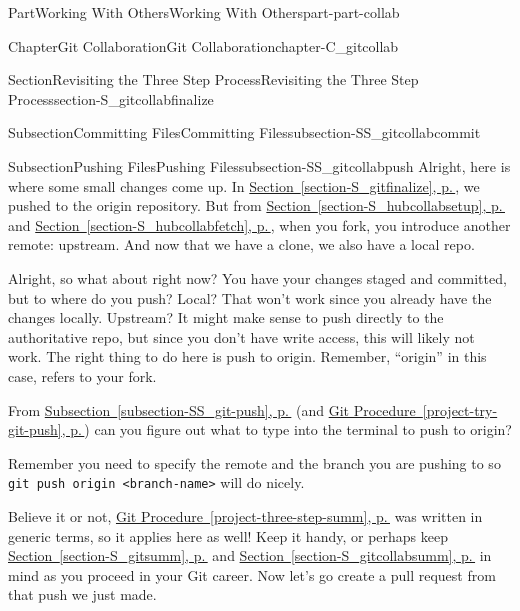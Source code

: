 \documentclass[twoside,10pt,]{book}
\newcommand{\xreffont}{\relax}
\newcommand{\mono}[1]{\texttt{#1}}
\begin{document}
\begin{partptx}{Part}{Working With Others}{}{Working With Others}{}{}{part-part-collab}
\begin{chapterptx}{Chapter}{Git Collaboration}{}{Git Collaboration}{}{}{chapter-C_gitcollab}
\begin{sectionptx}{Section}{Revisiting the Three Step Process}{}{Revisiting the Three Step Process}{}{}{section-S_gitcollabfinalize}
\begin{subsectionptx}{Subsection}{Committing Files}{}{Committing Files}{}{}{subsection-SS_gitcollabcommit}
\end{subsectionptx}
%
%
\typeout{************************************************}
\typeout{************************************************}
%
\begin{subsectionptx}{Subsection}{Pushing Files}{}{Pushing Files}{}{}{subsection-SS_gitcollabpush}
%
%
Alright, here is where some small changes come up. In \hyperref[section-S_gitfinalize]{Section~{\xreffont\ref{section-S_gitfinalize}}, p.\,\pageref{section-S_gitfinalize}}, we pushed to the origin repository. But from \hyperref[section-S_hubcollabsetup]{Section~{\xreffont\ref{section-S_hubcollabsetup}}, p.\,\pageref{section-S_hubcollabsetup}} and \hyperref[section-S_hubcollabfetch]{Section~{\xreffont\ref{section-S_hubcollabfetch}}, p.\,\pageref{section-S_hubcollabfetch}}, when you fork, you introduce another remote: upstream. And now that we have a clone, we also have a local repo.%
\par
Alright, so what about right now? You have your changes staged and committed, but to where do you push? Local? That won't work since you already have the changes locally. Upstream? It might make sense to push directly to the authoritative repo, but since you don't have write access, this will likely not work. The right thing to do here is push to origin. Remember, ``origin'' in this case, refers to your fork.%
\par
From \hyperref[subsection-SS_git-push]{Subsection~{\xreffont\ref{subsection-SS_git-push}}, p.\,\pageref{subsection-SS_git-push}} (and \hyperref[project-try-git-push]{Git Procedure~{\xreffont\ref{project-try-git-push}}, p.\,\pageref{project-try-git-push}}) can you figure out what to type into the terminal to push to origin?%
\par
Remember you need to specify the remote and the branch you are pushing to so \mono{git push origin <branch-name>} will do nicely.%
\end{subsectionptx}
\begin{conclusion}{}%
Believe it or not, \hyperref[project-three-step-summ]{Git Procedure~{\xreffont\ref{project-three-step-summ}}, p.\,\pageref{project-three-step-summ}} was written in generic terms, so it applies here as well! Keep it handy, or perhaps keep \hyperref[section-S_gitsumm]{Section~{\xreffont\ref{section-S_gitsumm}}, p.\,\pageref{section-S_gitsumm}} and \hyperref[section-S_gitcollabsumm]{Section~{\xreffont\ref{section-S_gitcollabsumm}}, p.\,\pageref{section-S_gitcollabsumm}} in mind as you proceed in your Git career. Now let's go create a pull request from that push we just made.%

\end{conclusion}
\end{sectionptx}
\end{chapterptx}
\end{partptx}
\end{document}
